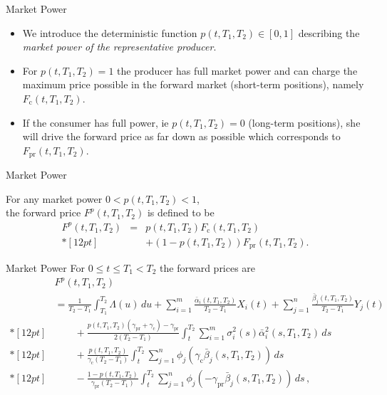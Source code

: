 {Market Power}
\begin{itemize}
\item<1-> We introduce the deterministic function $p(t,T_1,T_2)\in[0,1]$
describing the \emph{market power of the representative producer}.
\item<2-> For $p(t,T_1,T_2)=1$ the
producer has full market power and can charge the maximum price possible in the forward market (short-term positions),
namely $F_{\text{c}}(t,T_1,T_2)$.
\item<3-> If the
consumer has full power, ie $p(t,T_1,T_2)=0$ (long-term positions), she will drive the
forward price as far down as possible which corresponds to
$F_{\text{pr}}(t,T_1,T_2)$.

\end{itemize}







{Market Power}

For any market power $0<p(t,T_1,T_2)<1$,\\
the forward price $F^p(t,T_1,T_2)$ is defined to be
\begin{eqnarray}
\nonumber
F^p(t,T_1,T_2)&=&p(t,T_1,T_2)F_{\text{c}}(t,T_1,T_2)\\*[12pt]
&&+(1-p(t,T_1,T_2))
F_{\text{pr}}(t,T_1,T_2).
\end{eqnarray}



{Market Power}
For $0\leq t\leq T_1<T_2$ the forward prices are
$$\begin{array}{ll}
& F^p(t,T_1,T_2)\\
&=\frac1{T_2-T_1}\int_{T_1}^{T_2}\Lambda(u)\,du
+\sum_{i=1}^m\frac{\bar{\alpha}_i(t,T_1,T_2)}{T_2-T_1}X_i(t)+
\sum_{j=1}^n\frac{\bar{\beta}_j(t,T_1,T_2)}{T_2-T_1}Y_j(t) \\*[12pt]
&\qquad+\frac{p(t,T_1,T_2)(\gamma_{\text{pr}}+
\gamma_{\text{c}})-\gamma_{\text{pr}}}{2(T_2-T_1)}\int_t^{T_2}
\sum_{i=1}^m\sigma_i^2(s)\bar{\alpha}_i^2(s,T_1,T_2)\,ds \\*[12pt]
&\qquad+\frac{p(t,T_1,T_2)}{\gamma_{\text{c}}(T_2-T_1)}\int_t^{T_2}
\sum_{j=1}^n\phi_j(\gamma_{\text{c}}\bar{\beta}_j(s,T_1,T_2))\,ds \\*[12pt]
&\qquad-\frac{1-p(t,T_1,T_2)}{\gamma_{\text{pr}}(T_2-T_1)}
\int_t^{T_2}\sum_{j=1}^n\phi_j(-\gamma_{\text{pr}}\bar{\beta}_j(s,T_1,T_2))
\,ds\,,
\end{array}
$$






